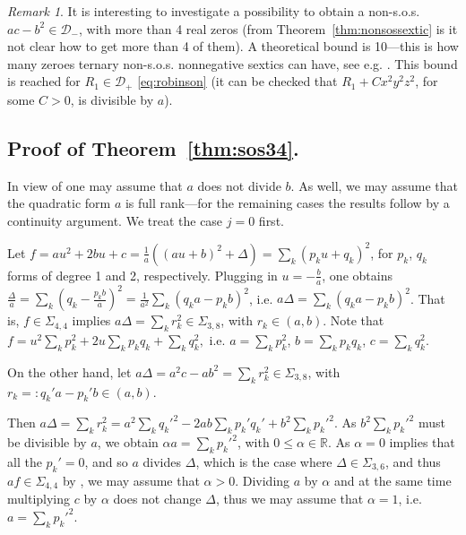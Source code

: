 \documentclass[a4paper,twoside,reqno]{amsart}
\newcommand{\RR}{\mathbb{R}}
\newcommand{\SosH}[2]{\Sigma_{{#1},{#2}}}
\theoremstyle{plain}
\theoremstyle{definition}
\theoremstyle{remark}
\newtheorem{rem}[prop]{Remark}
\begin{document}
\begin{rem}
It is interesting to investigate a possibility to obtain a non-s.o.s. $ac-b^2\in\mathcal{D}_-$, with more than 4
real zeros (from  Theorem~\ref{thm:nonsossextic} is it not clear how to get more than 4 of them).
A theoretical bound is 10---this is how many zeroes ternary non-s.o.s. nonnegative sextics can have, see e.g.
\cite{algbound}. This bound is reached for $R_1\in\mathcal{D}_+$ \eqref{eq:robinson} (it can be checked that $R_1+Cx^2 y^2 z^2$, for some $C>0$, is divisible by $a$).

\end{rem}

\subsection{Proof of Theorem~\ref{thm:sos34}.} 
In view of  one may assume that
$a$ does not divide $b$. As well, we may assume that the quadratic form $a$ is full rank---for the remaining cases the results follow by a continuity argument. We treat the case $j=0$ first.

Let $f=au^2+2bu+c=\frac{1}{a}((au+b)^2+\Delta)=\sum_k (p_ku+q_k)^2$, for $p_k$, $q_k$ forms of degree 1 and 2, respectively.
Plugging in $u=-\frac{b}{a}$, one obtains 
$\frac{\Delta}{a}=\sum_k (q_k-\frac{p_kb}{a})^2=\frac{1}{a^2}\sum_k (q_ka-p_kb)^2$, i.e. $a\Delta=\sum_k (q_ka-p_kb)^2$. That is, $f\in\SosH{4}{4}$ implies $a\Delta=\sum_k r_k^2\in\SosH{3}{8}$, with $r_k\in (a,b)$. Note that
$f=u^2\sum_k p_k^2+2u\sum_k p_k q_k+\sum_k q_k^2,$
i.e. $a=\sum_k p_k^2$, $b=\sum_k p_k q_k$, $c=\sum_k q_k^2$.



On the other hand, let $a\Delta=a^2c-ab^2=\sum_k r_k^2\in\SosH{3}{8}$, with $r_k=:q_k'a-p_k'b\in (a,b)$.

Then $a\Delta=\sum_k r_k^2=a^2\sum_{k}q_k'^2-2ab\sum_k p_k' q_k'+
b^2\sum_k p_k'^2$. As $b^2\sum_k p_k'^2$ must be divisible by $a$, we obtain
$\alpha a=\sum_k p_k'^2$, with $0\leq \alpha\in\RR$. As $\alpha=0$ implies that 
all the $p_k'=0$, and so $a$ divides $\Delta$, which is the case
where $\Delta\in\SosH{3}{6}$, and thus $af\in\SosH{4}{4}$ by ,
we may assume that $\alpha>0$. Dividing $a$ by $\alpha$ and at the same
time multiplying $c$ by $\alpha$ does not change $\Delta$, thus we may assume
that $\alpha=1$, i.e. $a=\sum_k p_k'^2$.
\end{document}

